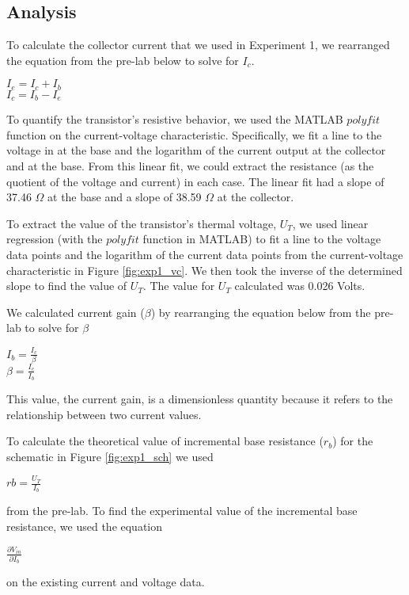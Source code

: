 \documentclass{article}
\begin{document}
\subsection{Analysis}
To calculate the collector current that we used in Experiment 1, we rearranged the equation from the pre-lab below to solve for $I_{c}$.
\begin{center}
    $I_{e} =I_{c} + I_{b}$ \\
    $I_{c} = I_{b} - I_{e}$
\end{center} 
To quantify the transistor's resistive behavior, we used the MATLAB $polyfit$ function on the current-voltage characteristic. Specifically, we fit a line to the voltage in at the base and the logarithm of the current output at the collector and at the base. From this linear fit, we could extract the resistance (as the quotient of the voltage and current) in each case. The linear fit had a slope of 37.46 $\Omega$ at the base and a slope of 38.59 $\Omega$ at the collector.

To extract the value of the transistor's thermal voltage, $U_T$, we used linear regression (with the $polyfit$ function in MATLAB) to fit a line to the voltage data points and the logarithm of the current data points from the current-voltage characteristic in Figure \ref{fig:exp1_vc}. We then took the inverse of the determined slope to find the value of $U_T$. The value for $U_{T}$ calculated was 0.026 Volts.

We calculated current gain ($\beta$) by rearranging the equation below from the pre-lab to solve for $\beta$
 \begin{center}
    $I_{b}= \frac{I_{c} }{\beta}$ \\
    $\beta = \frac{I_{c}}{I_{b}}$
 \end{center}
This value, the current gain, is a dimensionless quantity because it refers to the relationship between two current values. 

To calculate the theoretical value of incremental base resistance ($r_b$) for the schematic in Figure \ref{fig:exp1_sch} we used
\begin{center}
    $rb = \frac{U_{T}}{I_{b} }$
\end{center}
from the pre-lab.  To find the experimental value of the incremental base resistance, we used the equation
\begin{center}
    $\frac{\partial V_{in}}{\partial I_{b}}$ 
\end{center}
on the existing current and voltage data. 
\end{document}
